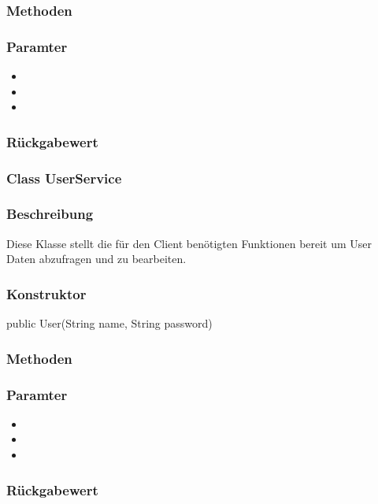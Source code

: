 \documentclass[a4paper]{scrreprt}
\begin{document}
\subsubsection*{Methoden}
\begin{addmargin}[25pt]{0pt}

\subsubsection*{Paramter}
\begin{itemize}
\item
\item
\item
\end{itemize}

\subsubsection*{Rückgabewert}
\end{addmargin}


\subsubsection{Class UserService}
\subsubsection*{Beschreibung}
Diese Klasse stellt die für den Client benötigten Funktionen bereit um User Daten abzufragen und zu bearbeiten. 

\subsubsection*{Konstruktor}
public User(String name, String password)

\subsubsection*{Methoden}
\begin{addmargin}[25pt]{0pt}

\subsubsection*{Paramter}
\begin{itemize}
\item
\item
\item
\end{itemize}

\subsubsection*{Rückgabewert}
\end{addmargin}
\end{document}
